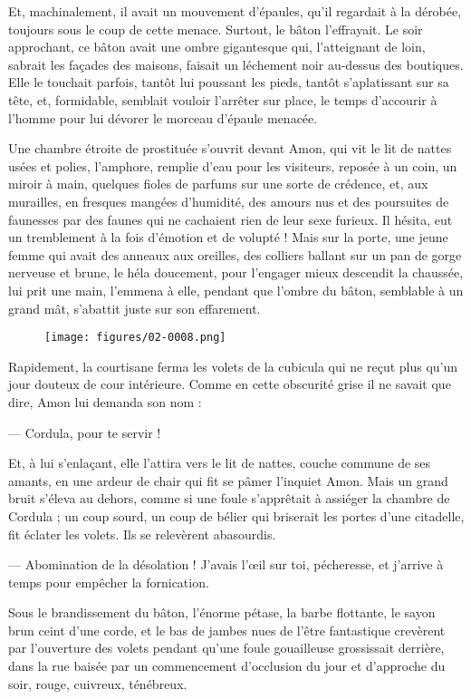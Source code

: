 \documentclass[a4paper, 11pt, oneside, polutonikogreek, french]{article}
\begin{document}
Et, machinalement, il avait un mouvement d'épaules, qu'il regardait à la dérobée, toujours sous le coup de cette menace. Surtout, le bâton l'effrayait. Le soir approchant, ce bâton avait une ombre gigantesque qui, l'atteignant de loin, sabrait les façades des maisons, faisait un léchement noir au-dessus des boutiques. Elle le touchait parfois, tantôt lui poussant les pieds, tantôt s'aplatissant sur sa tête, et, formidable, semblait vouloir l'arrêter sur place, le temps d'accourir à l'homme pour lui dévorer le morceau d'épaule menacée.

Une chambre étroite de prostituée s'ouvrit devant Amon, qui vit le lit de nattes usées et polies, l'amphore, remplie d'eau pour les visiteurs, reposée à un coin, un miroir à main, quelques fioles de parfums sur une sorte de crédence, et, aux murailles, en fresques mangées d'humidité, des amours nus et des poursuites de faunesses par des faunes qui ne cachaient rien de leur sexe furieux. Il hésita, eut un tremblement à la fois d'émotion et de volupté ! Mais sur la porte, une jeune femme qui avait des anneaux aux oreilles, des colliers ballant sur un pan de gorge nerveuse et brune, le héla doucement, pour l'engager mieux descendit la chaussée, lui prit une main, l'emmena à elle, pendant que l'ombre du bâton, semblable à un grand mât, s'abattit juste sur son effarement.
\begin{figure}[H]
\centering
\texttt{[image: figures/02-0008.png]}
\end{figure}
Rapidement, la courtisane ferma les volets de la cubicula qui ne reçut plus qu'un jour douteux de cour intérieure. Comme en cette obscurité grise il ne savait que dire, Amon lui demanda son nom :

--- Cordula, pour te servir !

Et, à lui s'enlaçant, elle l'attira vers le lit de nattes, couche commune de ses amants, en une ardeur de chair qui fit se pâmer l'inquiet Amon. Mais un grand bruit s'éleva au dehors, comme si une foule s'apprêtait à assiéger la chambre de Cordula ; un coup sourd, un coup de bélier qui briserait les portes d'une citadelle, fit éclater les volets. Ils se relevèrent abasourdis.

--- Abomination de la désolation ! J'avais l'œil sur toi, pécheresse, et j'arrive à temps pour empêcher la fornication.

Sous le brandissement du bâton, l'énorme pétase, la barbe flottante, le sayon brun ceint d'une corde, et le bas de jambes nues de l'être fantastique crevèrent par l'ouverture des volets pendant qu'une foule gouailleuse grossissait derrière, dans la rue baisée par un commencement d'occlusion du jour et d'approche du soir, rouge, cuivreux, ténébreux.
\end{document}
